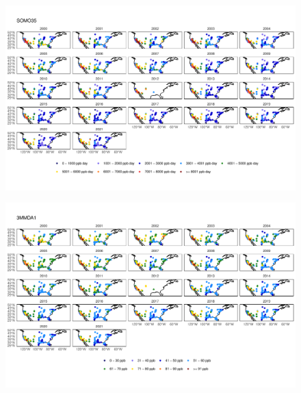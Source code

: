 \documentclass{article}
\begin{document}
\begin{figure}
\centering
\includegraphics[height=0.75\textheight]{figures/si_figures/fS17_metric_map_United-States-of-America_SOMO35.pdf}
\caption{}
\label{si_fig:metric_map_us_SOMO35}
\end{figure}
\clearpage

\begin{figure}
\centering
\includegraphics[height=0.75\textheight]{figures/si_figures/fS18_metric_map_United-States-of-America_3MMDA1.pdf}
\caption{}
\label{si_fig:metric_map_us_3MMDA1}
\end{figure}
\clearpage
\end{document}

